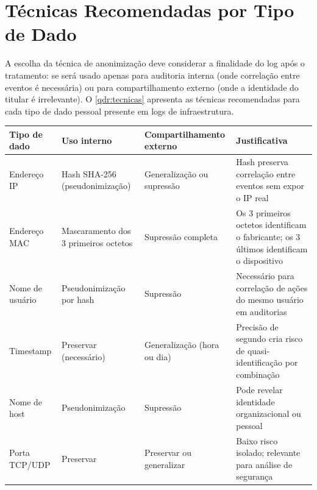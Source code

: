 \section{Técnicas Recomendadas por Tipo de Dado}
\label{sec:tecnicas}

A escolha da técnica de anonimização deve considerar a finalidade do log após o tratamento: se será usado apenas para auditoria interna (onde correlação entre eventos é necessária) ou para compartilhamento externo (onde a identidade do titular é irrelevante). O \autoref{qdr:tecnicas} apresenta as técnicas recomendadas para cada tipo de dado pessoal presente em logs de infraestrutura.

\begin{quadro}[htb]
    \caption{\label{qdr:tecnicas}Técnicas de anonimização recomendadas por tipo de dado em logs}
    \begin{tabular}{|p{2.8cm}|p{3cm}|p{3.2cm}|p{4.8cm}|}
        \hline
        \textbf{Tipo de dado} & \textbf{Uso interno} & \textbf{Compartilhamento externo} & \textbf{Justificativa} \\
        \hline
        Endereço IP & Hash SHA-256 (pseudonimização) & Generalização ou supressão & Hash preserva correlação entre eventos sem expor o IP real \\
        \hline
        Endereço MAC & Mascaramento dos 3 primeiros octetos & Supressão completa & Os 3 primeiros octetos identificam o fabricante; os 3 últimos identificam o dispositivo \\
        \hline
        Nome de usuário & Pseudonimização por hash & Supressão & Necessário para correlação de ações do mesmo usuário em auditorias \\
        \hline
        Timestamp & Preservar (necessário) & Generalização (hora ou dia) & Precisão de segundo cria risco de quasi-identificação por combinação \\
        \hline
        Nome de host & Pseudonimização & Supressão & Pode revelar identidade organizacional ou pessoal \\
        \hline
        Porta TCP/UDP & Preservar & Preservar ou generalizar & Baixo risco isolado; relevante para análise de segurança \\
        \hline
    \end{tabular}
\end{quadro}

